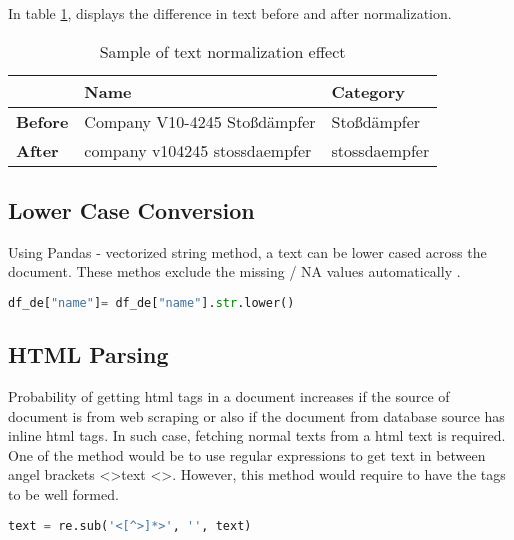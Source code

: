 In table \ref{table:TN}, displays the difference in text before and after normalization. 

\begin{table}[h]
      \caption{Sample of text normalization effect}
      \centering
      \label{table:TN}
\begin{tabular}{lll}
      \toprule 
                  &\textbf{Name} & \textbf{Category} \\ 
      \midrule
      \textbf{Before}& Company V10-4245 Stoßdämpfer & Stoßdämpfer \\
      \textbf{After}&company v104245 stossdaempfer & stossdaempfer \\
      
      \bottomrule
\end{tabular}
\end{table}

\subsection{Lower Case Conversion}

Using Pandas - vectorized string method, a text can be lower cased across the document. These methos exclude the missing  / NA values automatically \parencite{mckinney-proc-scipy-2010}.

\begin{lstlisting}[language=Python, caption={Pandas vectorized string method }]
      df_de["name"]= df_de["name"].str.lower()
\end{lstlisting}

\subsection{HTML Parsing}

Probability of getting html tags in a document increases if the source of document is from web scraping or also if the document from database source has inline html tags. In such case, fetching normal texts from a html text is required. One of the method would be to use regular expressions to get text in between angel brackets \textless \textgreater text \textless \textgreater. However, this method would require to have the tags to be well formed.
\begin{lstlisting}[language=Python, caption={Regular expression to get text from html}]
      text = re.sub('<[^>]*>', '', text)
\end{lstlisting}



